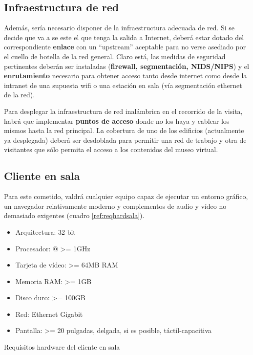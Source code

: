 \subsection{Infraestructura de red}

\par Además, sería necesario disponer de la infraestructura adecuada de red. Si se decide que va a se este el que tenga la salida a Internet, deberá estar dotado del correspondiente \textbf{enlace} con un ``upstream'' aceptable para no verse asediado por el cuello de botella de la red general. Claro está, las medidas de seguridad pertinentes deberán ser instaladas (\textbf{firewall, segmentación, NIDS/NIPS}) y el \textbf{enrutamiento} necesario para obtener acceso tanto desde internet como desde la intranet de una supuesta wifi o una estación en sala (vía segmentación ethernet de la red).

\par Para desplegar la infraestructura de red inalámbrica en el recorrido de la visita, habrá que implementar \textbf{puntos de acceso} donde no los haya y cablear los mismos hasta la red principal. La cobertura de uno de los edificios (actualmente ya desplegada) deberá ser desdoblada para permitir una red de trabajo y otra de visitantes que sólo permita el acceso a los contenidos del museo virtual.

\subsection{Cliente en sala}

\par Para este cometido, valdrá cualquier equipo capaz de ejecutar un entorno gráfico, un navegador relativamente moderno y complementos de audio y vídeo no demasiado exigentes (cuadro \ref{ref:reqhardsala}). 

\begin{table}[h]
  \begin{center}
    \begin{itemize}
     \item Arquitectura: 32 bit
     \item Procesador: @ >= 1GHz
     \item Tarjeta de vídeo: >= 64MB RAM
     \item Memoria RAM: >= 1GB
     \item Disco duro: >= 100GB
     \item Red: Ethernet Gigabit
     \item Pantalla: >= 20 pulgadas, delgada, si es posible, táctil-capacitiva
    \end{itemize}
  \end{center}
  \caption{Requisitos hardware del cliente en sala}
  \label{ref:reqhardsala}
\end{table}


